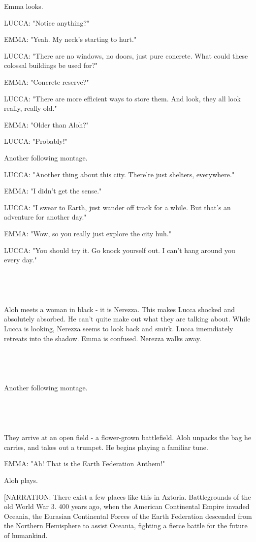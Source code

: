 \documentclass[11pt]{article}
\begin{document}
Emma looks.

LUCCA: "Notice anything?"

EMMA: "Yeah. My neck's starting to hurt."

LUCCA: "There are no windows, no doors, just pure concrete.
What could these colossal buildings be used for?"

EMMA: "Concrete reserve?"

LUCCA: "There are more efficient ways to store them. And look, they all look really, really old."

EMMA: "Older than Aloh?"

LUCCA: "Probably!"

Another following montage.

LUCCA: "Another thing about this city.
There're just shelters, everywhere."

EMMA: "I didn't get the sense."

LUCCA: "I swear to Earth, just wander off track for a while.
But that's an adventure for another day."

EMMA: "Wow, so you really just explore the city huh."

LUCCA: "You should try it.
Go knock yourself out.
I can't hang around you every day."

\ 

\ 

Aloh meets a woman in black - it is Nerezza.
This makes Lucca shocked and absolutely absorbed.
He can't quite make out what they are talking about.
While Lucca is looking, Nerezza seems to look back and smirk.
Lucca imemdiately retreats into the shadow.
Emma is confused.
Nerezza walks away.

\ 

\ 

Another following montage.

\ 

\ 

They arrive at an open field - a flower-grown battlefield.
Aloh unpacks the bag he carries, and takes out a trumpet. 
He begins playing a familiar tune.

EMMA: "Ah! That is the Earth Federation Anthem!"

Aloh plays.

[NARRATION: There exist a few places like this in Aztoria. 
Battlegrounds of the old World War 3. 
400 years ago, when the American Continental Empire invaded Oceania, the Eurasian Continental Forces of the Earth Federation descended from the Northern Hemisphere to assist Oceania, fighting a fierce battle for the future of humankind.
\end{document}
